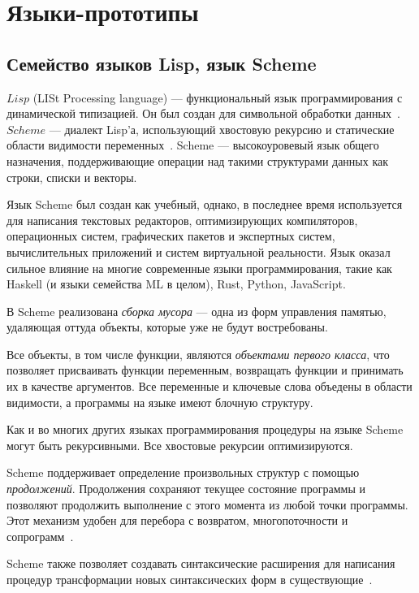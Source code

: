 \section{Языки-прототипы}
    \subsection{Семейство языков Lisp, язык Scheme}
        $Lisp$ (LISt Processing language) --- функциональный язык программирования с динамической типизацией. 
        Он был создан для символьной обработки данных~\cite{p_c_lisp}.
        $Scheme$ --- диалект Lisp'а, использующий хвостовую рекурсию и статические области видимости переменных~\cite{scheme_doc}.
        Scheme --- высокоуровевый язык общего назначения, поддерживающие операции над такими структурами данных как строки, списки и векторы.

        Язык Scheme был создан как учебный, однако, в последнее время используется для написания текстовых редакторов, оптимизирующих компиляторов, операционных систем, графических пакетов и экспертных систем, вычислительных приложений и систем виртуальной реальности.
        Язык оказал сильное влияние на многие современные языки программирования, такие как Haskell (и языки семейства ML в целом), Rust, Python, JavaScript.

        В Scheme реализована \textit{сборка мусора} --- одна из форм управления памятью, удаляющая оттуда объекты, которые уже не будут востребованы.
        
        Все объекты, в том числе функции, являются \textit{объектами первого класса}, что позволяет присваивать функции переменным, возвращать функции и принимать их в качестве аргументов.
        Все переменные и ключевые слова объедены в области видимости, а программы на языке имеют блочную структуру.
        
        Как и во многих других языках программирования процедуры на языке Scheme могут быть рекурсивными.
        Все хвостовые рекурсии оптимизируются.

        Scheme поддерживает определение произвольных структур с помощью \textit{продолжений}.
        Продолжения сохраняют текущее состояние программы и позволяют продолжить выполнение с этого момента из любой точки программы.
        Этот механизм удобен для перебора с возвратом, многопоточности и сопрограмм~\cite{scheme_pl}.

        Scheme также позволяет создавать синтаксические расширения для написания процедур трансформации новых синтаксических форм в существующие~\cite{scheme_pl}.

